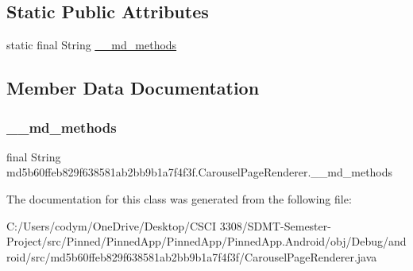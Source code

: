 \subsection*{Static Public Attributes}
\begin{DoxyCompactItemize}
\item 
static final String \hyperlink{classmd5b60ffeb829f638581ab2bb9b1a7f4f3f_1_1_carousel_page_renderer_aa7c3e4156a49e5c3fe304722e1b5019c}{\+\_\+\+\_\+md\+\_\+methods}
\end{DoxyCompactItemize}


\subsection{Member Data Documentation}
\mbox{\label{classmd5b60ffeb829f638581ab2bb9b1a7f4f3f_1_1_carousel_page_renderer_aa7c3e4156a49e5c3fe304722e1b5019c}} 
\subsubsection{\texorpdfstring{\+\_\+\+\_\+md\+\_\+methods}{\_\_md\_methods}}
{\footnotesize\ttfamily final String md5b60ffeb829f638581ab2bb9b1a7f4f3f.\+Carousel\+Page\+Renderer.\+\_\+\+\_\+md\+\_\+methods\hspace{0.3cm}{\ttfamily [static]}}



The documentation for this class was generated from the following file\+:\begin{DoxyCompactItemize}
\item 
C\+:/\+Users/codym/\+One\+Drive/\+Desktop/\+C\+S\+C\+I 3308/\+S\+D\+M\+T-\/\+Semester-\/\+Project/src/\+Pinned/\+Pinned\+App/\+Pinned\+App/\+Pinned\+App.\+Android/obj/\+Debug/android/src/md5b60ffeb829f638581ab2bb9b1a7f4f3f/Carousel\+Page\+Renderer.\+java\end{DoxyCompactItemize}

